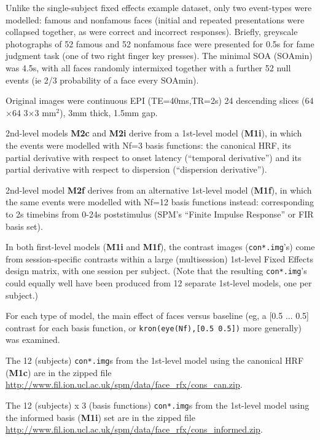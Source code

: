 Unlike the single-subject fixed effects example dataset, only two event-types were modelled: famous and nonfamous faces (initial and repeated presentations were collapsed together, as were correct and incorrect responses). Briefly, greyscale photographs of 52 famous and 52 nonfamous face were presented for 0.5s for fame judgment task (one of two right finger key presses). The minimal SOA (SOAmin) was 4.5s, with all faces randomly intermixed together with a further 52 null events (ie 2/3 probability of a face every SOAmin).

Original images were continuous EPI (TE=40ms,TR=2s) 24 descending slices (64$\times$64 3$\times$3 mm$^2$), 3mm thick, 1.5mm gap.

2nd-level models \textbf{M2c} and \textbf{M2i} derive from a 1st-level model (\textbf{M1i}), in which the events were modelled with Nf=3 basis functions: the canonical HRF, its partial derivative with respect to onset latency (``temporal derivative'') and its partial derivative with respect to dispersion (``dispersion derivative'').

2nd-level model \textbf{M2f} derives from an alternative 1st-level model (\textbf{M1f}), in which the same events were modelled with Nf=12 basis functions instead: corresponding to 2s timebins from 0-24s poststimulus (SPM's ``Finite Impulse Response'' or FIR basis set).

In both first-level models (\textbf{M1i} and \textbf{M1f}), the contrast images (\texttt{con*.img}'s) come from session-specific contrasts within a large (multisession) 1st-level Fixed Effects design matrix, with one session per subject. (Note that the resulting \texttt{con*.img}'s could equally well have been produced from 12 separate 1st-level models, one per subject.)

For each type of model, the main effect of faces versus baseline (eg, a [0.5 ... 0.5] contrast for each basis function, or \texttt{kron(eye(Nf),[0.5 0.5])} more generally) was examined.

The 12 (subjects) \texttt{con*.img}s from the 1st-level model using the canonical HRF (\textbf{M1c}) are in the zipped file
\newline \url{http://www.fil.ion.ucl.ac.uk/spm/data/face_rfx/cons_can.zip}.

The 12 (subjects) x 3 (basis functions) \texttt{con*.img}s from the 1st-level model using the informed basis (\textbf{M1i}) set are in the zipped file
\newline \url{http://www.fil.ion.ucl.ac.uk/spm/data/face_rfx/cons_informed.zip}.

